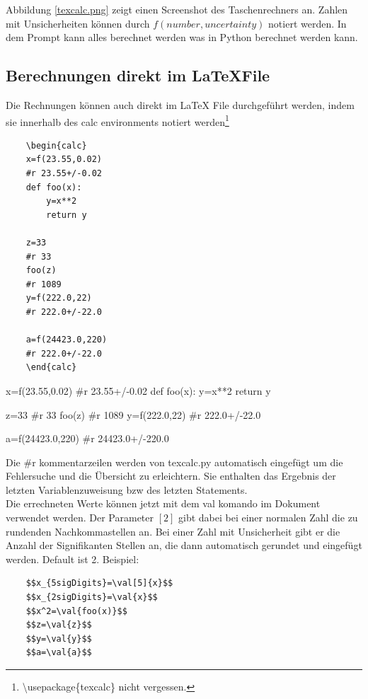 \documentclass[a4paper]{article}
\begin{document}
Abbildung \ref{texcalc.png} zeigt einen Screenshot des Taschenrechners an. Zahlen mit Unsicherheiten können
durch $f(number, uncertainty)$ notiert werden. In dem Prompt kann alles berechnet werden was in Python berechnet
werden kann. \\

\subsection{Berechnungen direkt im \LaTeX File}

Die Rechnungen können auch direkt im LaTeX File durchgeführt werden, indem sie innerhalb des calc environments
notiert werden\footnote{\textbackslash usepackage\{texcalc\} nicht vergessen.}

\begin{verbatim}
	\begin{calc}
	x=f(23.55,0.02)
	#r 23.55+/-0.02
	def foo(x):
		y=x**2
		return y

	z=33
	#r 33
	foo(z)
	#r 1089
	y=f(222.0,22)
	#r 222.0+/-22.0

	a=f(24423.0,220)
	#r 222.0+/-22.0
	\end{calc}
\end{verbatim}

\begin{calc}
x=f(23.55,0.02)
#r 23.55+/-0.02
def foo(x):
	y=x**2
	return y

z=33
#r 33
foo(z)
#r 1089
y=f(222.0,22)
#r 222.0+/-22.0

a=f(24423.0,220)
#r 24423.0+/-220.0
\end{calc}

Die \#r kommentarzeilen werden von texcalc.py automatisch eingefügt um die Fehlersuche und die Übersicht zu erleichtern.
Sie enthalten das Ergebnis der letzten Variablenzuweisung bzw des letzten Statements. \\

Die errechneten Werte können jetzt mit dem val komando im Dokument verwendet werden. Der Parameter $[2]$ gibt dabei bei
einer normalen Zahl die zu rundenden Nachkommastellen an. Bei einer Zahl mit Unsicherheit gibt er die Anzahl der
Signifikanten Stellen an, die dann automatisch gerundet und eingefügt werden. Default ist 2. Beispiel: \\

\begin{verbatim}
	$$x_{5sigDigits}=\val[5]{x}$$
	$$x_{2sigDigits}=\val{x}$$
	$$x^2=\val{foo(x)}$$
	$$z=\val{z}$$
	$$y=\val{y}$$
	$$a=\val{a}$$
\end{verbatim}
\end{document}
